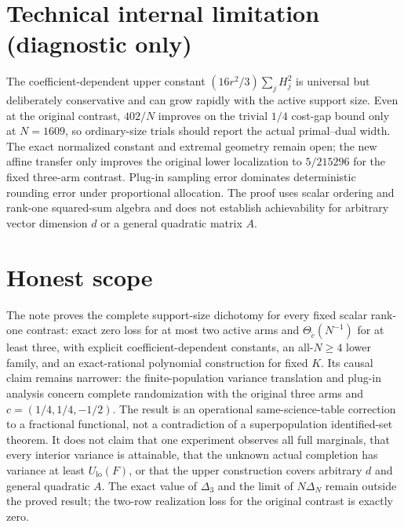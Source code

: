 \documentclass{article}
\begin{document}
\section*{Technical internal limitation (diagnostic only)}

The coefficient-dependent upper constant \((16r^2/3)\sum_jH_j^2\) is universal but deliberately conservative and can grow rapidly with the active support size.  Even at the original contrast, \(402/N\) improves on the trivial \(1/4\) cost-gap bound only at \(N=1609\), so ordinary-size trials should report the actual primal--dual width.  The exact normalized constant and extremal geometry remain open; the new affine transfer only improves the original lower localization to \(5/215296\) for the fixed three-arm contrast.  Plug-in sampling error dominates deterministic rounding error under proportional allocation.  The proof uses scalar ordering and rank-one squared-sum algebra and does not establish achievability for arbitrary vector dimension \(d\) or a general quadratic matrix \(A\).

\section{Honest scope}

The note proves the complete support-size dichotomy for every fixed scalar rank-one contrast: exact zero loss for at most two active arms and \(\Theta_{\widetilde c}(N^{-1})\) for at least three, with explicit coefficient-dependent constants, an all-\(N\ge4\) lower family, and an exact-rational polynomial construction for fixed \(K\).  Its causal claim remains narrower: the finite-population variance translation and plug-in analysis concern complete randomization with the original three arms and \(c=(1/4,1/4,-1/2)\).  The result is an operational same-science-table correction to a fractional functional, not a contradiction of a superpopulation identified-set theorem.  It does not claim that one experiment observes all full marginals, that every interior variance is attainable, that the unknown actual completion has variance at least \(U_{\mathrm{lo}}(F)\), or that the upper construction covers arbitrary \(d\) and general quadratic \(A\).  The exact value of \(\Delta_3\) and the limit of \(N\Delta_N\) remain outside the proved result; the two-row realization loss for the original contrast is exactly zero.
\end{document}
